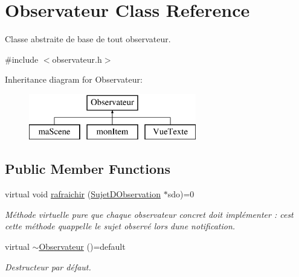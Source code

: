 \hypertarget{class_observateur}{}\section{Observateur Class Reference}
\label{class_observateur}


Classe abstraite de base de tout observateur.  




{\ttfamily \#include $<$observateur.\+h$>$}

Inheritance diagram for Observateur\+:\begin{figure}[H]
\begin{center}
\leavevmode
\includegraphics[height=2.000000cm]{class_observateur}
\end{center}
\end{figure}
\subsection*{Public Member Functions}
\begin{DoxyCompactItemize}
\item 
virtual void \hyperlink{class_observateur_a4fcbecba73ee923d201246207b8470ce}{rafraichir} (\hyperlink{class_sujet_d_observation}{Sujet\+D\+Observation} $\ast$sdo)=0
\begin{DoxyCompactList}\small\item\em Méthode virtuelle pure que chaque observateur concret doit implémenter \+: c\textquotesingle{}est cette méthode qu\textquotesingle{}appelle le sujet observé lors d\textquotesingle{}une notification. \end{DoxyCompactList}\item 
\hypertarget{class_observateur_ac1f97bef4e22594403513069d8269e17}{}virtual \hyperlink{class_observateur_ac1f97bef4e22594403513069d8269e17}{$\sim$\+Observateur} ()=default\label{class_observateur_ac1f97bef4e22594403513069d8269e17}

\begin{DoxyCompactList}\small\item\em Destructeur par défaut. \end{DoxyCompactList}\end{DoxyCompactItemize}


